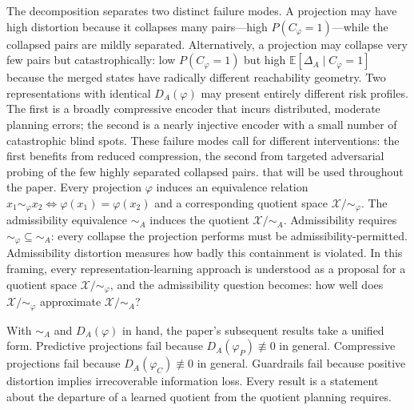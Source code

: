 \documentclass[11pt, a4paper]{article}
\theoremstyle{plain}
\theoremstyle{definition}
\theoremstyle{remark}
\newcommand{\simA}{\sim_A}
\newcommand{\DA}{D_A(\varphi)}
\begin{document}
The decomposition separates two distinct failure modes. A projection may have
high distortion because it collapses many pairs---high $P(C_\varphi=1)$---while
the collapsed pairs are mildly separated. Alternatively, a projection may collapse
very few pairs but catastrophically: low $P(C_\varphi=1)$ but high
$\mathbb{E}[\Delta_A \mid C_\varphi=1]$ because the merged states have radically
different reachability geometry. Two representations with identical $\DA$ may
present entirely different risk profiles. The first is a broadly compressive
encoder that incurs distributed, moderate planning errors; the second is a nearly
injective encoder with a small number of catastrophic blind spots. These failure
modes call for different interventions: the first benefits from reduced compression,
the second from targeted adversarial probing of the few highly separated collapsed
pairs. that will be used
throughout the paper. Every projection $\varphi$ induces an equivalence relation
$x_1 \sim_\varphi x_2 \iff \varphi(x_1) = \varphi(x_2)$ and a corresponding
quotient space $\mathcal{X}/{\sim_\varphi}$. The admissibility equivalence
$\simA$ induces the quotient $\mathcal{X}/{\simA}$. Admissibility requires
${\sim_\varphi} \subseteq {\simA}$: every collapse the projection performs must
be admissibility-permitted. Admissibility distortion measures how badly this
containment is violated. In this framing, every representation-learning approach
is understood as a proposal for a quotient space $\mathcal{X}/{\sim_\varphi}$,
and the admissibility question becomes: how well does $\mathcal{X}/{\sim_\varphi}$
approximate $\mathcal{X}/{\simA}$?

With $\simA$ and $\DA$ in hand, the paper's subsequent results take a unified
form. Predictive projections fail because $D_A(\varphi_P) \not\equiv 0$ in
general. Compressive projections fail because $D_A(\varphi_C) \not\equiv 0$
in general. Guardrails fail because positive distortion implies irrecoverable
information loss. Every result is a statement about the departure of a learned
quotient from the quotient planning requires.
\end{document}
